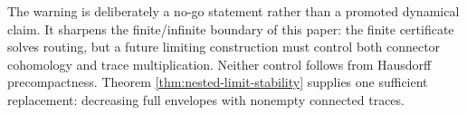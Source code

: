 The warning is deliberately a no-go statement rather than a promoted
dynamical claim.  It sharpens the finite/infinite boundary of this paper:
the finite certificate solves routing, but a future limiting construction
must control both connector cohomology and trace multiplication.  Neither
control follows from Hausdorff precompactness.  Theorem
\ref{thm:nested-limit-stability} supplies one sufficient replacement:
decreasing full envelopes with nonempty connected traces.
